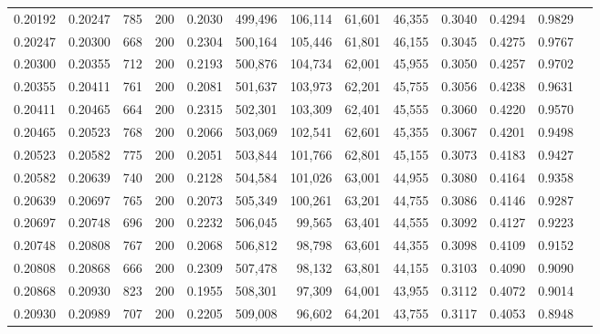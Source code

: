 \begin{tabular}{rrrrrrrrrrrrr}
0.20192 & 0.20247 &   785 & 200 &                                     0.2030 & 499,496 & 106,114 &  61,601 &  46,355 & 0.3040 & 0.4294 & 0.9829 \\
0.20247 & 0.20300 &   668 & 200 &                                     0.2304 & 500,164 & 105,446 &  61,801 &  46,155 & 0.3045 & 0.4275 & 0.9767 \\
0.20300 & 0.20355 &   712 & 200 &                                     0.2193 & 500,876 & 104,734 &  62,001 &  45,955 & 0.3050 & 0.4257 & 0.9702 \\
0.20355 & 0.20411 &   761 & 200 &                                     0.2081 & 501,637 & 103,973 &  62,201 &  45,755 & 0.3056 & 0.4238 & 0.9631 \\
0.20411 & 0.20465 &   664 & 200 &                                     0.2315 & 502,301 & 103,309 &  62,401 &  45,555 & 0.3060 & 0.4220 & 0.9570 \\
0.20465 & 0.20523 &   768 & 200 &                                     0.2066 & 503,069 & 102,541 &  62,601 &  45,355 & 0.3067 & 0.4201 & 0.9498 \\
0.20523 & 0.20582 &   775 & 200 &                                     0.2051 & 503,844 & 101,766 &  62,801 &  45,155 & 0.3073 & 0.4183 & 0.9427 \\
0.20582 & 0.20639 &   740 & 200 &                                     0.2128 & 504,584 & 101,026 &  63,001 &  44,955 & 0.3080 & 0.4164 & 0.9358 \\
0.20639 & 0.20697 &   765 & 200 &                                     0.2073 & 505,349 & 100,261 &  63,201 &  44,755 & 0.3086 & 0.4146 & 0.9287 \\
0.20697 & 0.20748 &   696 & 200 &                                     0.2232 & 506,045 &  99,565 &  63,401 &  44,555 & 0.3092 & 0.4127 & 0.9223 \\
0.20748 & 0.20808 &   767 & 200 &                                     0.2068 & 506,812 &  98,798 &  63,601 &  44,355 & 0.3098 & 0.4109 & 0.9152 \\
0.20808 & 0.20868 &   666 & 200 &                                     0.2309 & 507,478 &  98,132 &  63,801 &  44,155 & 0.3103 & 0.4090 & 0.9090 \\
0.20868 & 0.20930 &   823 & 200 &                                     0.1955 & 508,301 &  97,309 &  64,001 &  43,955 & 0.3112 & 0.4072 & 0.9014 \\
0.20930 & 0.20989 &   707 & 200 &                                     0.2205 & 509,008 &  96,602 &  64,201 &  43,755 & 0.3117 & 0.4053 & 0.8948 \\

\end{tabular}
